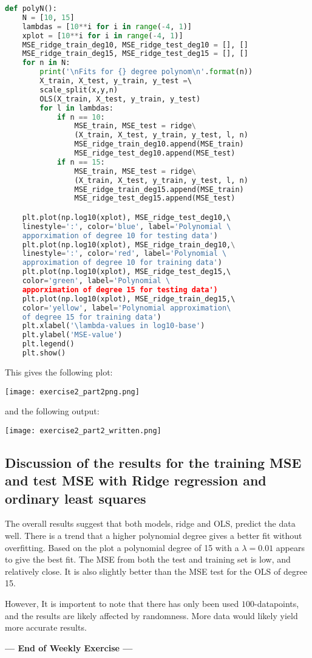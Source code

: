 \documentclass{article}
\begin{document}
\begin{lstlisting}[language=Python]    
def polyN():
    N = [10, 15]
    lambdas = [10**i for i in range(-4, 1)]
    xplot = [10**i for i in range(-4, 1)] 
    MSE_ridge_train_deg10, MSE_ridge_test_deg10 = [], []
    MSE_ridge_train_deg15, MSE_ridge_test_deg15 = [], []
    for n in N:
        print('\nFits for {} degree polynom\n'.format(n))
        X_train, X_test, y_train, y_test =\ 
        scale_split(x,y,n)
        OLS(X_train, X_test, y_train, y_test)         
        for l in lambdas:
            if n == 10:
                MSE_train, MSE_test = ridge\
                (X_train, X_test, y_train, y_test, l, n)
                MSE_ridge_train_deg10.append(MSE_train)
                MSE_ridge_test_deg10.append(MSE_test)
            if n == 15:
                MSE_train, MSE_test = ridge\
                (X_train, X_test, y_train, y_test, l, n)
                MSE_ridge_train_deg15.append(MSE_train)
                MSE_ridge_test_deg15.append(MSE_test)

    plt.plot(np.log10(xplot), MSE_ridge_test_deg10,\ 
    linestyle=':', color='blue', label='Polynomial \
    apporximation of degree 10 for testing data')
    plt.plot(np.log10(xplot), MSE_ridge_train_deg10,\
    linestyle=':', color='red', label='Polynomial \
    approximation of degree 10 for training data')
    plt.plot(np.log10(xplot), MSE_ridge_test_deg15,\ 
    color='green', label='Polynomial \ 
    apporximation of degree 15 for testing data')
    plt.plot(np.log10(xplot), MSE_ridge_train_deg15,\ 
    color='yellow', label='Polynomial approximation\
    of degree 15 for training data')
    plt.xlabel('\lambda-values in log10-base')
    plt.ylabel('MSE-value')
    plt.legend()
    plt.show()
\end{lstlisting}
This gives the following plot:
\begin{center}
    \texttt{[image: exercise2\_part2png.png]} 
\end{center}
and the following output:
\begin{center}
    \texttt{[image: exercise2\_part2\_written.png]} 
\end{center}
\subsection*{ Discussion of the results for the training MSE and test MSE with Ridge regression and ordinary least squares}
The overall results suggest that both models, ridge and OLS, predict the data well.
There is a trend that a higher polynomial degree gives a better fit without overfitting.
Based on the plot a polynomial degree of 15 with a $\lambda = 0.01$ appears to give the best 
fit. The MSE from both the test and training set is low, and relatively close. It is also 
slightly better than the MSE test for the OLS of degree 15.

However, It is importent to note that there has only been used $100$-datapoints, and the results are likely 
affected by randomness. More data would likely yield more accurate results. 

\hfill
\begin{center}
\textbf{--- End of Weekly Exercise ---}
\end{center}
\end{document}
